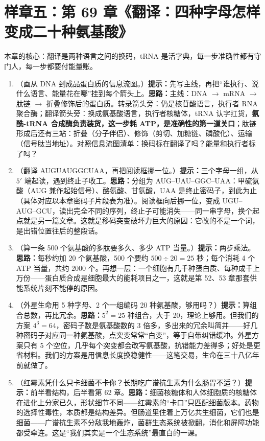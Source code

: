\section{样章五：第 69 章《翻译：四种字母怎样变成二十种氨基酸》}

本章的核心：翻译是两种语言之间的换码，tRNA 是活字典，每一步准确性都有守门人，每一步都要付能量账。

\begin{enumerate}[itemsep=3pt]
\item （画从 DNA 到成品蛋白质的信息流图。）\textbf{提示：}先写主线，再把“谁执行、说什么语言、能量花在哪”挂到每个箭头上。\textbf{思路：}主线：DNA $\rightarrow$ mRNA $\rightarrow$ 肽链 $\rightarrow$ 折叠修饰后的蛋白质。转录箭头旁：仍是核苷酸语言，执行者 RNA 聚合酶；翻译箭头旁：换成氨基酸语言，执行者核糖体，tRNA 认字扛货，\textbf{氨酰-tRNA 合成酶负责装货，这一步耗 ATP，是准确性的第一道关口}；肽链形成后还有三站：折叠（分子伴侣）、修饰（剪切、加糖链、磷酸化）、运输（信号肽当地址）。对照信息流图清单：换码标在翻译了吗？能量和执行者标了吗？
\item （翻译 AUGUAUGGCUAA，再把阅读框挪一位。）\textbf{提示：}三个字母一组，从 $5'$ 端起读，遇到终止子收工。\textbf{思路：}分组为 AUG--UAU--GGC--UAA：甲硫氨酸（AUG 兼作起始信号）、酪氨酸、甘氨酸，UAA 是终止密码子，到此为止（具体对应以本章密码子片段表为准）。阅读框向后挪一位，变成 UGU--AUG--GCU，读出完全不同的序列，终止子可能消失——同一串字母，换个起点就是另一篇文章。这就是移码突变破坏力巨大的原因：它改的不是一个词，是出错位置往后的整段话。
\item （算一条 500 个氨基酸的多肽要多久、多少 ATP 当量。）\textbf{提示：}两步乘法。\textbf{思路：}每秒约加 20 个氨基酸，500 个要约 $500\div 20=25$ 秒；每个消耗 4 个 ATP 当量，共约 $2000$ 个。再想一层：一个细胞有几千种蛋白质、每种成千上万份——蛋白质合成是细胞最大的能耗项目之一，这就是第 52、53 章那套供能系统片刻不能停的原因。
\item （外星生命用 5 种字母、2 个一组编码 20 种氨基酸，够用吗？）\textbf{提示：}算组合总数，再比冗余。\textbf{思路：}$5^2=25$ 种组合，大于 20，理论上够用。但我们的方案 $4^3=64$，密码子数是氨基酸数的 3 倍多，多出来的冗余叫简并——好几种密码子对应同一种氨基酸，点突变常常“白变”，等于自带纠错缓冲。外星方案只有 5 个空位，几乎每个突变都会改写氨基酸，抗错能力差得多；好处是更省材料。我们的方案是用信息长度换稳健性——这笔交易，生命在三十八亿年前就做了。
\item （红霉素凭什么只卡细菌不卡你？长期吃广谱抗生素为什么肠胃不适？）\textbf{提示：}前半看结构，后半看第 62 章。\textbf{思路：}细菌核糖体和人体细胞质的核糖体在进化上分家已久，形状细节不同——红霉素的“卡口”只匹配细菌版本。药物的选择性毒性，本质都是结构差异。但肠道里住着上万亿共生细菌，它们也是细菌——广谱抗生素不分敌我地轰炸，菌群生态系统被掀翻，消化和屏障功能都受牵连。这是“我们其实是一个生态系统”最直白的一课。

\end{enumerate}
